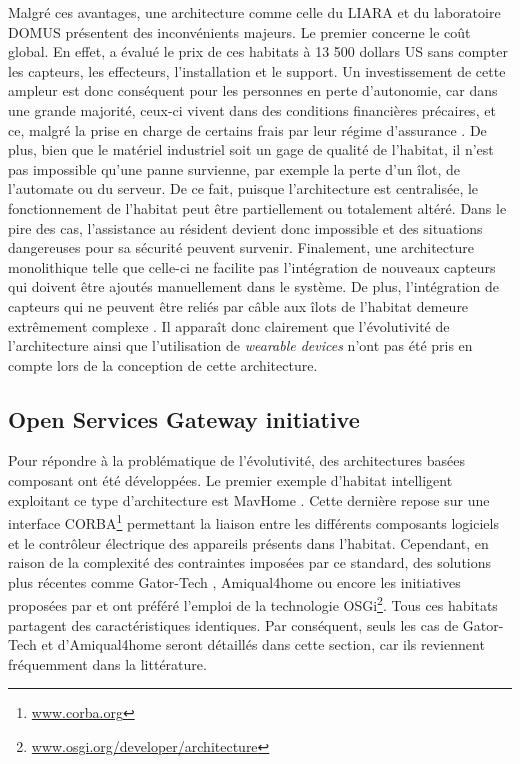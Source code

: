 Malgré ces avantages, une architecture comme celle du \acs{LIARA} et du laboratoire \acs{DOMUS} présentent des inconvénients majeurs. Le premier concerne le coût global. En effet, \cite{Plantevin2018a} a évalué le prix de ces habitats à 13 500 dollars US sans compter les capteurs, les effecteurs, l'installation et le support. Un investissement de cette ampleur est donc conséquent pour les personnes en perte d'autonomie, car dans une grande majorité, ceux-ci vivent dans des conditions financières précaires, et ce, malgré la prise en charge de certains frais par leur régime d'assurance \citep{AlzheimersAssociation2018}. De plus, bien que le matériel industriel soit un gage de qualité de l'habitat, il n'est pas impossible qu'une panne survienne, par exemple la perte d'un îlot, de l'automate ou du serveur. De ce fait, puisque l'architecture est centralisée, le fonctionnement de l'habitat peut être partiellement ou totalement altéré. Dans le pire des cas, l'assistance au résident devient donc impossible et des situations dangereuses pour sa sécurité peuvent survenir. Finalement, une architecture monolithique telle que celle-ci ne facilite pas l'intégration de nouveaux capteurs qui doivent être ajoutés manuellement dans le système. De plus, l'intégration de capteurs qui ne peuvent être reliés par câble aux îlots de l'habitat demeure extrêmement complexe \citep{Plantevin2018a}. Il apparaît donc clairement que l'évolutivité de l'architecture ainsi que l'utilisation de \textit{wearable devices} n'ont pas été pris en compte lors de la conception de cette architecture.

\subsection{Open Services Gateway initiative}

Pour répondre à la problématique de l'évolutivité, des architectures basées composant ont été développées. Le premier exemple d'habitat intelligent exploitant ce type d'architecture est MavHome \citep{DJCook2003}. Cette dernière repose sur une interface \ac{CORBA}\footnote{\url{www.corba.org}} permettant la liaison entre les différents composants logiciels et le contrôleur électrique des appareils présents dans l'habitat. Cependant, en raison de la complexité des contraintes imposées par ce standard, des solutions plus récentes comme Gator-Tech \citep{Helal2005}, Amiqual4home \citep{Lago2017} ou encore les initiatives proposées par \cite{Novak2011} et \cite{Cheng2012} ont préféré l'emploi de la technologie \ac{OSGi}\footnote{\url{www.osgi.org/developer/architecture}}. Tous ces habitats partagent des caractéristiques identiques. Par conséquent, seuls les cas de Gator-Tech et d'Amiqual4home seront détaillés dans cette section, car ils reviennent fréquemment dans la littérature.

